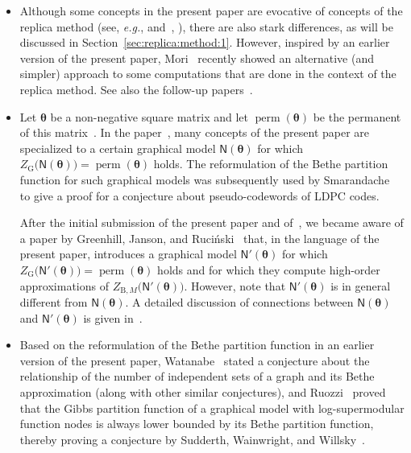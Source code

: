 \documentclass[journal, twocolumn]{IEEEtran}
\newcommand{\eg}{\emph{e.g.}}
\newcommand{\graph}[1]{\mathsf{#1}}
\newcommand{\matrtheta}{\boldsymbol{\theta}}
\newcommand{\graphN}{\graph{N}}
\newcommand{\ZBetheM}[1]{Z_{\mathrm{B}, #1}}
\newcommand{\?}{\mathrm{?}}
\newcommand{\ZGibbs}{Z_{\mathrm{G}}}
\newcommand{\perm}{\operatorname{perm}}
\begin{document}
\begin{itemize}
\item Although some concepts in the present paper are evocative of concepts of
  the replica method (see, \eg, \cite{Mezard:Parisi:Virasoro:87:1}
  and~\cite[Chapter~8]{Mezard:Montanari:09:1},
  \cite[Appendix~I]{Tanaka:02:1}), there are also stark differences, as will
  be discussed in Section~\ref{sec:replica:method:1}. However, inspired by an
  earlier version of the present paper, Mori~\cite{Mori:11:1} recently showed
  an alternative (and simpler) approach to some computations that are done in
  the context of the replica method. See also the follow-up
  papers~\cite{Mori:Tanaka:12:1, Mori:Tanaka:12:2}.

\item Let $\matrtheta$ be a non-negative square matrix and let
  $\perm(\matrtheta)$ be the permanent of this matrix~\cite{Minc:78}. In the
  paper~\cite{Vontobel:11:3:subm}, many concepts of the present paper are
  specialized to a certain graphical model $\graphN(\matrtheta)$ for which
  $\ZGibbs\bigl( \graphN(\matrtheta) \bigr) = \perm(\matrtheta)$ holds. The
  reformulation of the Bethe partition function for such graphical models was
  subsequently used by Smarandache~\cite{Smarandache:11:1:subm} to give a
  proof for a conjecture about pseudo-codewords of LDPC codes.

  After the initial submission of the present paper and
  of~\cite{Vontobel:11:3:subm}, we became aware of a paper by Greenhill,
  Janson, and Ruci{\'n}ski~\cite{Greenhill:Janson:Rucinski:10:1} that, in the
  language of the present paper, introduces a graphical model
  $\graphN'(\matrtheta)$ for which $\ZGibbs\bigl( \graphN'(\matrtheta) \bigr)
  = \perm(\matrtheta)$ holds and for which they compute high-order
  approximations of $\ZBetheM{M}\bigl( \graphN'(\matrtheta) \bigr)$. However,
  note that $\graphN'(\matrtheta)$ is in general different from
  $\graphN(\matrtheta)$. A detailed discussion of connections between
  $\graphN(\matrtheta)$ and $\graphN'(\matrtheta)$ is given
  in~\cite[Section~VII.E]{Vontobel:11:3:subm}.

\item Based on the reformulation of the Bethe partition function in an earlier
  version of the present paper, Watanabe~\cite{Watanabe:11:1} stated a
  conjecture about the relationship of the number of independent sets of a
  graph and its Bethe approximation (along with other similar conjectures),
  and Ruozzi~\cite{Ruozzi:12:1} proved that the Gibbs partition function of a
  graphical model with log-supermodular function nodes is always lower bounded
  by its Bethe partition function, thereby proving a conjecture by Sudderth,
  Wainwright, and Willsky~\cite{Sudderth:Wainwright:Willsky:07:1}.


\end{itemize}
\end{document}
